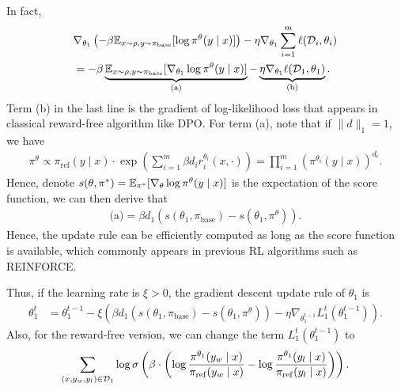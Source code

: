 In fact, 
\begin{align*}
    &\nabla_{\theta_1}\left(-\beta \mathbb{E}_{x\sim \rho, y\sim\pi_{\mathrm{base}}}[\log \pi^\theta(y\mid x)]\right)-\eta \nabla_{\theta_1}\sum_{i=1}^m \ell(\mathcal{D}_i, \theta_i)\\
    &=-\beta \underbrace{\mathbb{E}_{x\sim \rho, y\sim\pi_{\mathrm{base}}}[\nabla_{\theta_1}\log \pi^\theta(y\mid x)]}_{\text{(a)}}-\underbrace{\eta \nabla_{\theta_1}\ell(\mathcal{D}_1, \theta_1)}_{\text{(b)}}.
\end{align*}
Term (b) in the last line is the gradient of log-likelihood loss that appears in classical reward-free algorithm like DPO. For term (a), note that if $\|d\|_1 = 1$, we have \begin{align*}\pi^\theta  \propto \pi_{\mathrm{ref}}(y \mid x) \cdot \exp\left(\sum_{i=1}^m \beta d_i r_i^{\theta_i}(x,\cdot)\right) =  \prod_{i=1}^m (\pi^{\theta_i}(y\mid x))^{d_i}.\end{align*} Hence, denote $s(\theta,\pi^*) = \mathbb{E}_{\pi^*}[\nabla_\theta \log\pi^\theta(y\mid x)]$ is the expectation of the score function, we can then derive that 
\begin{align*}
    \text{(a)}= \beta d_1 \left(s(\theta_1, \pi_{\mathrm{base}}) - s(\theta_1, \pi^\theta)\right).
\end{align*}
Hence, the update rule can be efficiently computed as long as the score function is available, which commonly appears in previous RL algorithms such as REINFORCE.

Thus, if the learning rate is $\xi>0$, the gradient descent update rule of $\theta_1$ is 
\begin{align*}\theta_1^t &= \theta_1^{t-1}-\xi\left(\beta d_1(s(\theta_1,\pi_{\mathrm{base}}) - s(\theta_1, \pi^\theta))  - \eta \nabla_{\theta_1^{t-1}}L_1^t(\theta_1^{t-1})\right).\end{align*}
Also, for the reward-free version, we can change the term $L_1^t(\theta_1^{t-1})$ to $$\sum_{(x,y_w,y_l) \in \mathcal{D}_1} \log \sigma \left(\beta\cdot \left(\log\frac{\pi^{\theta_1}(y_w\mid x)}{\pi_{\mathrm{ref}}(y_w\mid x)}-\log\frac{\pi^{\theta_1}(y_l\mid x)}{\pi_{\mathrm{ref}}(y_l\mid x)}\right)\right).$$


